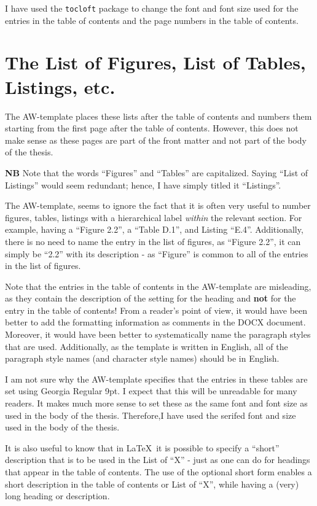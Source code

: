 \documentclass[12pt, twoside]{article}
\begin{document}
I have used the \texttt{tocloft} package to change the font and font size used for the entries in the table of contents and the page numbers in the table of contents.


\section{The List of Figures, List of Tables, Listings, etc.}

The AW-template places these lists after the table of contents and numbers them starting from the first page after the table of contents. However, this does not make sense as these pages are part of the front matter and not part of the body of the thesis.

\textbf{NB} Note that the words ``Figures'' and ``Tables'' are capitalized. Saying ``List of Listings'' would seem redundant; hence, I have simply titled it ``Listings''.

The AW-template, seems to ignore the fact that it is often very useful to number figures, tables, listings with a hierarchical label \textit{within} the relevant section. For example, having a ``Figure 2.2'', a ``Table D.1'', and Listing ``E.4''. Additionally, there is no need to name the entry in the list of figures, as ``Figure 2.2'', it can simply be ``2.2'' with its description - as ``Figure'' is common to all of the entries in the list of figures.

Note that the entries in the table of contents in the AW-template are misleading, as they contain the description of the setting for the heading and \textbf{not} for the entry in the table of contents! From a reader's point of view, it would have been better to add the formatting information as comments in the \gls{DOCX} document. Moreover, it would have been better to systematically name the paragraph styles that are used. Additionally, as the template is written in English, all of the paragraph style names (and character style names) should be in English.

I am not sure why the AW-template specifies that the entries in these tables are set using Georgia Regular 9pt. I expect that this will be unreadable for many readers. It makes much more sense to set these as the same font and font size as used in the body of the thesis. Therefore,I have used the serifed font and size used in the body of the thesis.

It is also useful to know that in \LaTeX\ it is possible to specify a ``short'' description that is to be used in the List of ``X'' - just as one can do for headings that appear in the table of contents. The use of the optional short form enables a short description in the table of contents or List of ``X'', while having a (very) long heading or description.
\end{document}
